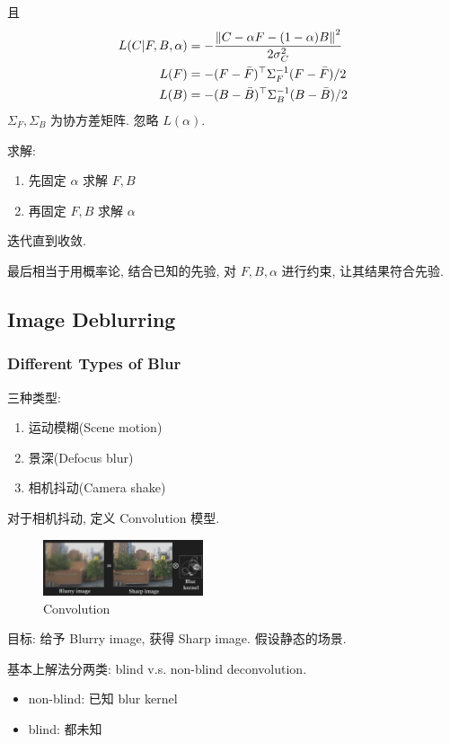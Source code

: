 且
\begin{align*}
    L(C|F, B, \alpha)&=-\frac{\left\lVert C- \alpha F-(1-\alpha)B\right\rVert^2}{2\sigma_C^2}\\
    L(F)&=-(F-\bar{F})^\top \Sigma_F^{-1}(F-\bar{F})/2\\
    L(B)&=-(B-\bar{B})^\top \Sigma_B^{-1}(B-\bar{B})/2\\
\end{align*}
$\Sigma_F, \Sigma_B$ 为协方差矩阵. 忽略 $L(\alpha)$. 

求解:
\begin{enumerate}
    \item 先固定 $\alpha$ 求解 $F, B$
    \item 再固定 $F, B$ 求解 $\alpha$
\end{enumerate}
迭代直到收敛. 

最后相当于用概率论, 结合已知的先验, 对 $F, B, \alpha$ 进行约束, 让其结果符合先验. 


\subsection{Image Deblurring}

\subsubsection{Different Types of Blur}
三种类型:
\begin{enumerate}
    \item 运动模糊(Scene motion)
    \item 景深(Defocus blur)
    \item 相机抖动(Camera shake)
\end{enumerate}


对于相机抖动, 定义 Convolution 模型. 
\begin{figure}[!htb]
    \centering
    \includegraphics[width=0.42\textwidth]{pic/ACG9//convolution}
    \caption{Convolution}
\end{figure}

目标: 给予 Blurry image, 获得 Sharp image. 假设静态的场景. 

基本上解法分两类: blind v.s. non-blind deconvolution.
\begin{itemize}
    \item non-blind: 已知 blur kernel
    \item blind: 都未知
\end{itemize}

